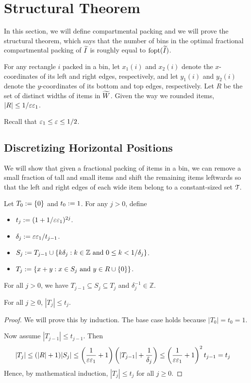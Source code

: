 \section{Structural Theorem}
\label{sec:thin-bp:struct}

In this section, we will define compartmental packing
and we will prove the structural theorem, which says that
the number of bins in the optimal fractional compartmental packing of $\widetilde{I}$
is roughly equal to $\operatorname{fopt}(\widetilde{I})$.

For any rectangle $i$ packed in a bin, let $x_1(i)$ and $x_2(i)$ denote the $x$-coordinates
of its left and right edges, respectively, and let $y_1(i)$ and $y_2(i)$
denote the $y$-coordinates of its bottom and top edges, respectively.
Let $R$ be the set of distinct widths of items in $\widetilde{W}$.
Given the way we rounded items, $|R| \le 1/\varepsilon\varepsilon_1$.

Recall that $\varepsilon_1 \le \varepsilon \le 1/2$.

\subsection{Discretizing Horizontal Positions}

We will show that given a fractional packing of items in a bin,
we can remove a small fraction of tall and small items
and shift the remaining items leftwards so that the left and right edges
of each wide item belong to a constant-sized set $\mathcal{T}$.

Let $T_0 := \{0\}$ and $t_0 := 1$. For any $j > 0$, define
\begin{itemize}
\item $t_j := (1+1/\varepsilon\varepsilon_1)^{2j}$.
\item $\delta_j := \varepsilon\varepsilon_1/t_{j-1}$.
\item $S_j := T_{j-1} \cup \{k\delta_j: k \in \mathbb{Z}
    \textrm{ and } 0 \le k < 1/\delta_j\}$.
\item $T_j := \{x + y: x \in S_j \textrm{ and } y \in R \cup \{0\}\}$.
\end{itemize}

\begin{observation}
\label{obs:shift}
For all $j > 0$, we have $T_{j-1} \subseteq S_j \subseteq T_j$
and $\delta_j^{-1} \in \mathbb{Z}$.
\end{observation}

\begin{lemma}
For all $j \ge 0$, $|T_j| \le t_j$.
\end{lemma}
\begin{proof}
We will prove this by induction. The base case holds because $|T_0| = t_0 = 1$.

Now assume $|T_{j-1}| \le t_{j-1}$. Then
\begin{align*}
|T_j| &\le (|R|+1)|S_j|
    \le \left(\frac{1}{\varepsilon\varepsilon_1}+1\right)\left(|T_{j-1}| + \frac{1}{\delta_j}\right)
    \le \left(\frac{1}{\varepsilon\varepsilon_1}+1\right)^2 t_{j-1}
    = t_j
\end{align*}
Hence, by mathematical induction, $|T_j| \le t_j$ for all $j \ge 0$.
\end{proof}

